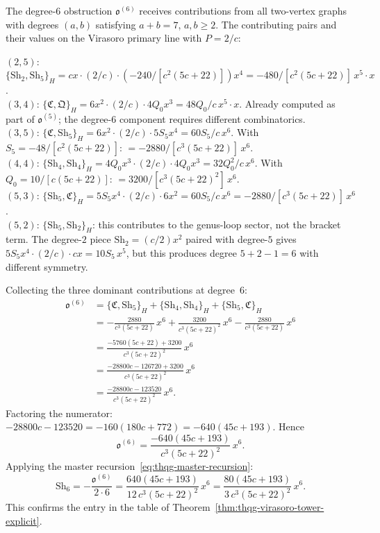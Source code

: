 \begin{computation}
The degree-$6$ obstruction $\mathfrak{o}^{(6)}$ receives
contributions from all two-vertex graphs with degrees
$(a,b)$ satisfying $a + b = 7$, $a,b \geq 2$. The
contributing pairs and their values on the Virasoro
primary line with $P = 2/c$:

\smallskip
\noindent
$(2,5)$: $\{\mathrm{Sh}_2, \mathrm{Sh}_5\}_H
= cx\cdot(2/c)\cdot(-240/[c^2(5c+22)])x^4
= -480/[c^2(5c+22)]\,x^5 \cdot x$. \\
$(3,4)$: $\{\mathfrak{C}, \mathfrak{Q}\}_H
= 6x^2\cdot(2/c)\cdot 4Q_0 x^3
= 48Q_0/c\,x^5\cdot x$. Already computed as part of
$\mathfrak{o}^{(5)}$; the degree-$6$ component requires
different combinatorics. \\
$(3,5)$: $\{\mathfrak{C}, \mathrm{Sh}_5\}_H
= 6x^2\cdot(2/c)\cdot 5S_5 x^4
= 60S_5/c\,x^6$.
With $S_5 = -48/[c^2(5c+22)]$:
$= -2880/[c^3(5c+22)]\,x^6$. \\
$(4,4)$: $\{\mathrm{Sh}_4, \mathrm{Sh}_4\}_H
= 4Q_0 x^3\cdot(2/c)\cdot 4Q_0 x^3
= 32Q_0^2/c\,x^6$.
With $Q_0 = 10/[c(5c+22)]$:
$= 3200/[c^3(5c+22)^2]\,x^6$. \\
$(5,3)$: $\{\mathrm{Sh}_5, \mathfrak{C}\}_H
= 5S_5 x^4\cdot(2/c)\cdot 6x^2
= 60S_5/c\,x^6 = -2880/[c^3(5c+22)]\,x^6$. \\
$(5,2)$: $\{\mathrm{Sh}_5, \mathrm{Sh}_2\}_H$:
this contributes to the genus-loop sector, not the
bracket term. The degree-$2$ piece $\mathrm{Sh}_2 = (c/2)x^2$
paired with degree-$5$ gives $5S_5 x^4\cdot(2/c)\cdot cx
= 10S_5\,x^5$, but this produces degree $5 + 2 - 1 = 6$
with different symmetry.

\smallskip\noindent
Collecting the three dominant contributions at degree~$6$:
\begin{align*}
\mathfrak{o}^{(6)}
&= \{\mathfrak{C}, \mathrm{Sh}_5\}_H
+ \{\mathrm{Sh}_4, \mathrm{Sh}_4\}_H
+ \{\mathrm{Sh}_5, \mathfrak{C}\}_H
\\
&= -\frac{2880}{c^3(5c+22)}\,x^6
+ \frac{3200}{c^3(5c+22)^2}\,x^6
- \frac{2880}{c^3(5c+22)}\,x^6
\\
&= \frac{-5760(5c+22) + 3200}{c^3(5c+22)^2}\,x^6
\\
&= \frac{-28800c - 126720 + 3200}{c^3(5c+22)^2}\,x^6
\\
&= \frac{-28800c - 123520}{c^3(5c+22)^2}\,x^6.
\end{align*}
Factoring the numerator:
$-28800c - 123520 = -160(180c + 772) = -640(45c + 193)$.
Hence
\begin{equation}%
\mathfrak{o}^{(6)}
= \frac{-640(45c+193)}{c^3(5c+22)^2}\,x^6.
\end{equation}
Applying the master recursion~\eqref{eq:thqg-master-recursion}:
\begin{equation}%
\mathrm{Sh}_6
= -\frac{\mathfrak{o}^{(6)}}{2\cdot 6}
= \frac{640(45c+193)}{12\,c^3(5c+22)^2}\,x^6
= \frac{80(45c+193)}{3\,c^3(5c+22)^2}\,x^6.
\end{equation}
This confirms the entry in the table of
Theorem~\ref{thm:thqg-virasoro-tower-explicit}.


\end{computation}
